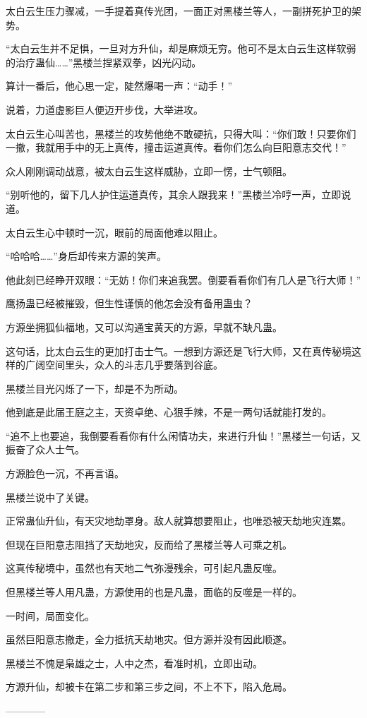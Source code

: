 \begin{this_body}
太白云生压力骤减，一手提着真传光团，一面正对黑楼兰等人，一副拼死护卫的架势。

“太白云生并不足惧，一旦对方升仙，却是麻烦无穷。他可不是太白云生这样软弱的治疗蛊仙……”黑楼兰捏紧双拳，凶光闪动。

算计一番后，他心思一定，陡然爆喝一声：“动手！”

说着，力道虚影巨人便迈开步伐，大举进攻。

太白云生心叫苦也，黑楼兰的攻势他绝不敢硬抗，只得大叫：“你们敢！只要你们一撤，我就用手中的无上真传，撞击运道真传。看你们怎么向巨阳意志交代！”

众人刚刚调动战意，被太白云生这样威胁，立即一愣，士气顿阻。

“别听他的，留下几人护住运道真传，其余人跟我来！”黑楼兰冷哼一声，立即说道。

太白云生心中顿时一沉，眼前的局面他难以阻止。

“哈哈哈……”身后却传来方源的笑声。

他此刻已经睁开双眼：“无妨！你们来追我罢。倒要看看你们有几人是飞行大师！”

鹰扬蛊已经被摧毁，但生性谨慎的他怎会没有备用蛊虫？

方源坐拥狐仙福地，又可以沟通宝黄天的方源，早就不缺凡蛊。

这句话，比太白云生的更加打击士气。一想到方源还是飞行大师，又在真传秘境这样的广阔空间里头，众人的斗志几乎要落到谷底。

黑楼兰目光闪烁了一下，却是不为所动。

他到底是此届王庭之主，天资卓绝、心狠手辣，不是一两句话就能打发的。

“追不上也要追，我倒要看看你有什么闲情功夫，来进行升仙！”黑楼兰一句话，又振奋了众人士气。

方源脸色一沉，不再言语。

黑楼兰说中了关键。

正常蛊仙升仙，有天灾地劫罩身。敌人就算想要阻止，也唯恐被天劫地灾连累。

但现在巨阳意志阻挡了天劫地灾，反而给了黑楼兰等人可乘之机。

这真传秘境中，虽然也有天地二气弥漫残余，可引起凡蛊反噬。

但黑楼兰等人用凡蛊，方源使用的也是凡蛊，面临的反噬是一样的。

一时间，局面变化。

虽然巨阳意志撤走，全力抵抗天劫地灾。但方源并没有因此顺遂。

黑楼兰不愧是枭雄之士，人中之杰，看准时机，立即出动。

方源升仙，却被卡在第二步和第三步之间，不上不下，陷入危局。

------------

\end{this_body}

